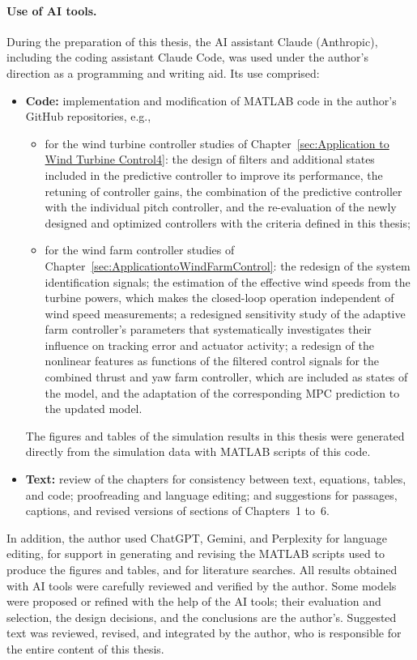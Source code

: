 \paragraph{Use of AI tools.}
During the preparation of this thesis, the AI assistant Claude (Anthropic), including the coding assistant Claude Code, was used under the author's direction as a programming and writing aid. Its use comprised:
\begin{itemize}
    \item \textbf{Code:} implementation and modification of MATLAB code in the author's GitHub repositories, e.g.,
    \begin{itemize}
        \item for the wind turbine controller studies of Chapter~\ref{sec:Application to Wind Turbine Control4}: the design of filters and additional states included in the predictive controller to improve its performance, the retuning of controller gains, the combination of the predictive controller with the individual pitch controller, and the re-evaluation of the newly designed and optimized controllers with the criteria defined in this thesis;
        \item for the wind farm controller studies of Chapter~\ref{sec:ApplicationtoWindFarmControl}: the redesign of the system identification signals; the estimation of the effective wind speeds from the turbine powers, which makes the closed-loop operation independent of wind speed measurements; a redesigned sensitivity study of the adaptive farm controller's parameters that systematically investigates their influence on tracking error and actuator activity; a redesign of the nonlinear features as functions of the filtered control signals for the combined thrust and yaw farm controller, which are included as states of the model, and the adaptation of the corresponding MPC prediction to the updated model.
    \end{itemize}
    The figures and tables of the simulation results in this thesis were generated directly from the simulation data with MATLAB scripts of this code.
    \item \textbf{Text:} review of the chapters for consistency between text, equations, tables, and code; proofreading and language editing; and suggestions for passages, captions, and revised versions of sections of Chapters~1 to~6.
\end{itemize}
In addition, the author used ChatGPT, Gemini, and Perplexity for language editing, for support in generating and revising the MATLAB scripts used to produce the figures and tables, and for literature searches. All results obtained with AI tools were carefully reviewed and verified by the author. Some models were proposed or refined with the help of the AI tools; their evaluation and selection, the design decisions, and the conclusions are the author's. Suggested text was reviewed, revised, and integrated by the author, who is responsible for the entire content of this thesis.

